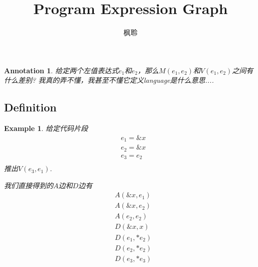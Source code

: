 \documentclass{article}
\newtheorem{example}[theorem]{Example}
\newtheorem{annotation}[theorem]{Annotation}
\begin{document}
\title{Program Expression Graph}
\author{枫聆}
\maketitle
\tableofcontents


\begin{annotation}
给定两个左值表达式$e_1$和$e_2$，那么$M(e_1,e_2)$和$V(e_1,e_2)$之间有什么差别? 我真的弄不懂，我甚至不懂它定义language是什么意思....
\end{annotation}

\subsection{Definition}

\begin{example}
\rm 给定代码片段
$$
\begin{aligned}
&e_1 = \&x \\
&e_2 = \&x \\
&e_3 = e_2 \\
\end{aligned}
$$
推出$V(e_3,e_1)$.

我们直接得到的$A$边和$D$边有
$$
\begin{aligned}
&A(\&x,e_1) \\
&A(\&x,e_2) \\
&A(e_2,e_2) \\
&D(\&x, x) \\
&D(e_1, *e_2) \\
&D(e_2, *e_2) \\
&D(e_3, *e_3) \\
\end{aligned}
$$

\end{example}
\end{document}
